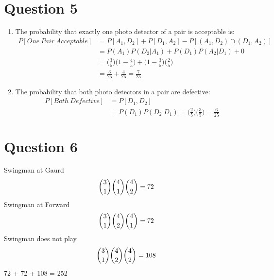 \documentclass[12pt, letterpaper, fleqn]{article}
\begin{document}
\section*{Question 5}
	\begin{enumerate}
		\item The probability that exactly one photo detector of a pair is acceptable is:
			\begin{align*}
				P[One\ Pair\ Acceptable] &= P[A_1, D_2] + P[D_1, A_2] - P[(A_1, D_2) \cap (D_1, A_2)] \\
				&= P(A_1)P(D_2 | A_1) + P(D_1)P(A_2 | D_1) + 0 \\
				&= \Big(\frac{3}{5}\Big)\Big(1-\frac{4}{5}\Big) + \Big(1 - \frac{3}{5}\Big)\Big(\frac{2}{5}\Big) \\
				&= \frac{3}{25} + \frac{4}{25} = \frac{7}{25}
			\end{align*}
		\item The probability that both photo detectors in a pair are defective:
			\begin{align*}
				P[Both\ Defective] &= P[D_1, D_2] \\
				&=P(D_1)P(D_2 | D_1) = \Big(\frac{2}{5}\Big) \Big( \frac{3}{5} \Big) = \frac{6}{25}
			\end{align*}
	\end{enumerate}
\section*{Question 6}
	Swingman at Gaurd
	\begin{align*}
		\dbinom{3}{1} \dbinom{4}{1} \dbinom{4}{2} = 72
	\end{align*}
	Swingman at Forward
	\begin{align*}
		\dbinom{3}{1} \dbinom{4}{2} \dbinom{4}{1} = 72
	\end{align*}
	Swingman does not play
	\begin{align*}
		\dbinom{3}{1} \dbinom{4}{2} \dbinom{4}{2} = 108
	\end{align*}
	72 + 72 + 108 = 252
\end{document}
